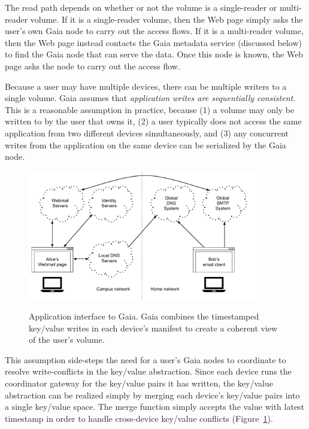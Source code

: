 The read path depends on whether or not the volume is a single-reader or
multi-reader volume.  If it is a single-reader volume, then the Web page simply
asks the user's own Gaia node to carry out the access flows.  If it is a
multi-reader volume, then the Web page instead contacts the Gaia metadata
service (discussed below) to find the Gaia node that can serve the data.
Once this node is known, the Web page asks the node to
carry out the access flow.

Because a user may have multiple devices, there can be multiple writers to
a single volume.  Gaia assumes that \emph{application writes are
sequentially consistent}.  This is a reasonable assumption in practice, because
(1) a volume may only be written to by the user
that owns it, (2) a user typically does not access the same application from
two different devices simultaneously, and (3) any concurrent writes from the
application on the same device can be serialized by the Gaia node.

\begin{figure}[h]
   \caption{Application interface to Gaia.  Gaia combines the timestamped
   key/value writes in each device's manifest to create a coherent view of the
   user's volume.}
   \centering
   \includegraphics[width=0.9\textwidth,page=17]{figures/dissertation-figures}
   \label{fig:chap3-gaia-global-key-value-store}
\end{figure}

This assumption side-steps the need for a user's Gaia nodes to
coordinate to resolve write-conflicts in the key/value abstraction.  Since each
device runs the coordinator gateway for the key/value pairs it has
written, the key/value abstraction can be realized simply by
merging each device's key/value pairs into a single key/value space.
The merge function simply accepts the
value with latest timestamp in order to handle cross-device
key/value conflicts (Figure~\ref{fig:chap3-gaia-global-key-value-store}).

